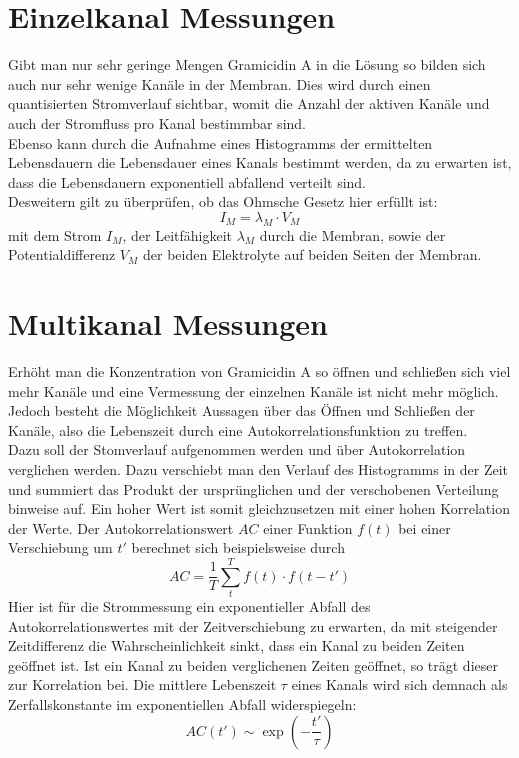 \documentclass{include/thesisclass3}
\newcommand{\cc}{\cdot}
\begin{document}


\section{Einzelkanal Messungen}
Gibt man nur sehr geringe Mengen Gramicidin A in die Lösung so bilden sich auch nur sehr wenige Kanäle in der Membran. Dies wird durch einen quantisierten Stromverlauf sichtbar, womit die Anzahl der aktiven Kanäle und auch der Stromfluss pro Kanal bestimmbar sind.\\
Ebenso kann durch die Aufnahme eines Histogramms der ermittelten Lebensdauern die Lebensdauer eines Kanals bestimmt werden, da zu erwarten ist, dass die Lebensdauern exponentiell abfallend verteilt sind.\\
Desweitern gilt zu überprüfen, ob das Ohmsche Gesetz hier erfüllt ist:
\[ I_M = \lambda_M \cc V_M\]
mit dem Strom $I_M$, der Leitfähigkeit $\lambda_M$ durch die Membran, sowie der Potentialdifferenz $V_M$ der beiden Elektrolyte auf beiden Seiten der Membran.


\section{Multikanal Messungen}
Erhöht man die Konzentration von Gramicidin A so öffnen und schließen sich viel mehr Kanäle und eine Vermessung der einzelnen Kanäle ist nicht mehr möglich. Jedoch besteht die Möglichkeit Aussagen über das Öffnen und Schließen der Kanäle, also die Lebenszeit durch eine Autokorrelationsfunktion zu treffen.\\
Dazu soll der Stomverlauf aufgenommen werden und über Autokorrelation verglichen werden. Dazu verschiebt man den Verlauf des Histogramms in der Zeit und summiert das Produkt der ursprünglichen und der verschobenen Verteilung binweise auf. Ein hoher Wert ist somit gleichzusetzen mit einer hohen Korrelation der Werte. Der Autokorrelationswert $AC$ einer Funktion $f(t)$ bei einer Verschiebung um $t'$ berechnet sich beispielsweise durch
\[ AC = \frac{1}{T}\sum_t^T f(t)\cc f(t-t') \]
Hier ist für die Strommessung ein exponentieller Abfall des Autokorrelationswertes mit der Zeitverschiebung zu erwarten, da mit steigender Zeitdifferenz die Wahrscheinlichkeit sinkt, dass ein Kanal zu beiden Zeiten geöffnet ist. Ist ein Kanal zu beiden verglichenen Zeiten geöffnet, so trägt dieser zur Korrelation bei. Die mittlere Lebenszeit $\tau$ eines Kanals wird sich demnach als Zerfallskonstante im exponentiellen Abfall widerspiegeln:
\[ AC(t') \sim \exp\left( - \frac{t'}{\tau}\right)\]
\end{document}
